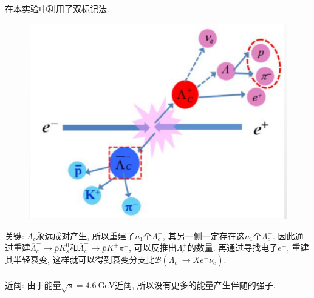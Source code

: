 \documentclass{beamer}
\begin{document}
\begin{frame}
在本实验中利用了双标记法. 
\begin{figure}[h]
\centering
\includegraphics[scale=0.4]{DT.png}
\end{figure}
\end{frame}

\begin{frame}
关键: $\Lambda_c$永远成对产生, 所以重建了$n_1$个$\Lambda_c^-$, 其另一侧一定存在这$n_1$个$\Lambda_c^+$. 因此通过重建$\overline{\Lambda}_c^-\rightarrow\overline{p}K_s^0$和$\overline{\Lambda}_c^-\rightarrow\overline{p}K^+\pi^-$, 可以反推出$\Lambda_c^+$的数量. 再通过寻找电子$e^+$, 重建其半轻衰变, 这样就可以得到衰变分支比$\mathcal{B}(\Lambda_c^+\rightarrow Xe^+\nu_e)$.\\
~\\
近阈: 由于能量$\sqrt{s}=4.6\ \mathrm{GeV}$近阈, 所以没有更多的能量产生伴随的强子.

\end{frame}




\begin{frame}[allowframebreaks]

\end{frame}
\end{document}
